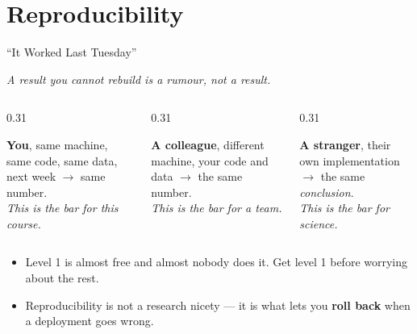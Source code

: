 \section{Reproducibility}

\begin{frame}{``It Worked Last Tuesday''}

    \centering
    \large
    \textit{A result you cannot rebuild is a rumour, not a result.}
    \vspace{0.3em}

    \scriptsize
    \begin{columns}[T]
        \begin{column}{0.31\textwidth}
            \begin{tcolorbox}[colback=green!6, colframe=green!50!black, title=\scriptsize 1. Repeatable]
                \scriptsize
                \textbf{You}, same machine, same code, same data, next week $\rightarrow$ same number.
                \vspace{0.09em}
                \\ \textit{This is the bar for this course.}
            \end{tcolorbox}
        \end{column}
        \begin{column}{0.31\textwidth}
            \begin{tcolorbox}[colback=blue!6, colframe=blue!50!black, title=\scriptsize 2. Reproducible]
                \scriptsize
                \textbf{A colleague}, different machine, your code and data $\rightarrow$ the same number.
                \vspace{0.09em}
                \\ \textit{This is the bar for a team.}
            \end{tcolorbox}
        \end{column}
        \begin{column}{0.31\textwidth}
            \begin{tcolorbox}[colback=orange!6, colframe=orange!60!black, title=\scriptsize 3. Replicable]
                \scriptsize
                \textbf{A stranger}, their own implementation $\rightarrow$ the same \emph{conclusion}.
                \vspace{0.09em}
                \\ \textit{This is the bar for science.}
            \end{tcolorbox}
        \end{column}
    \end{columns}

    \vspace{0.36em}
    \begin{itemize}
        \item Level 1 is almost free and almost nobody does it. Get level 1 before worrying about the rest.
        \item Reproducibility is not a research nicety --- it is what lets you \textbf{roll back} when a
              deployment goes wrong.
    \end{itemize}

\end{frame}
